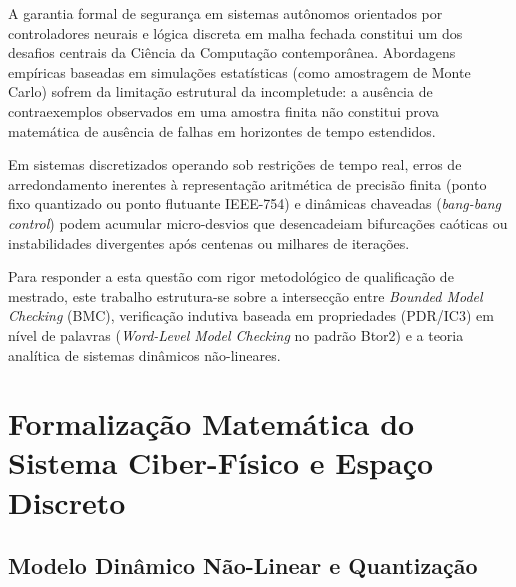 \documentclass[11pt,a4paper]{article}
\theoremstyle{definition}
\begin{document}
A garantia formal de segurança em sistemas autônomos orientados por controladores neurais e lógica discreta em malha fechada constitui um dos desafios centrais da Ciência da Computação contemporânea. Abordagens empíricas baseadas em simulações estatísticas (como amostragem de Monte Carlo) sofrem da limitação estrutural da incompletude: a ausência de contraexemplos observados em uma amostra finita não constitui prova matemática de ausência de falhas em horizontes de tempo estendidos.

Em sistemas discretizados operando sob restrições de tempo real, erros de arredondamento inerentes à representação aritmética de precisão finita (ponto fixo quantizado ou ponto flutuante IEEE-754) e dinâmicas chaveadas (\textit{bang-bang control}) podem acumular micro-desvios que desencadeiam bifurcações caóticas ou instabilidades divergentes após centenas ou milhares de iterações.

\vspace{0.2cm}
\noindent{}
\vspace{0.2cm}

Para responder a esta questão com rigor metodológico de qualificação de mestrado, este trabalho estrutura-se sobre a intersecção entre \textit{Bounded Model Checking} (BMC), verificação indutiva baseada em propriedades (PDR/IC3) em nível de palavras (\textit{Word-Level Model Checking} no padrão Btor2) e a teoria analítica de sistemas dinâmicos não-lineares.

\section{Formalização Matemática do Sistema Ciber-Físico e Espaço Discreto}

\subsection{Modelo Dinâmico Não-Linear e Quantização}
\end{document}
